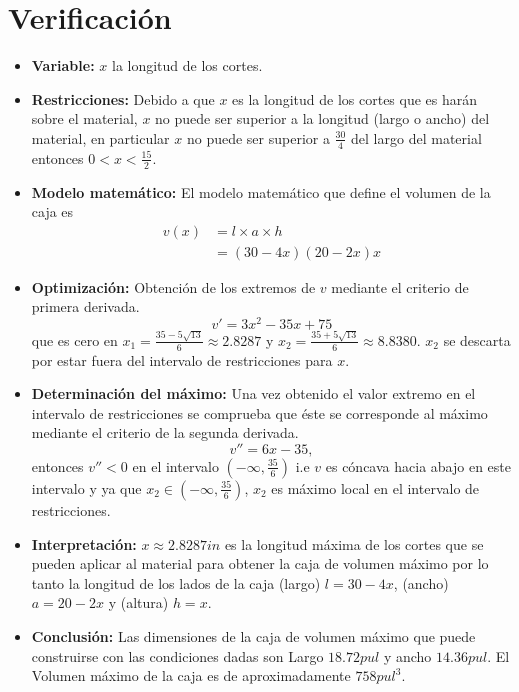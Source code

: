 \documentclass[a0paper,fleqn]{betterposter}
\begin{document}
{}{

\section{Verificación}
\begin{itemize}
    \item \textbf{Variable:} $x$ la longitud de los cortes.
    \item \textbf{Restricciones:} Debido a que $x$ es la longitud de los cortes que es harán sobre el material, $x$ no puede ser superior a la longitud (largo o ancho) del material, en particular $x$ no puede ser superior a $\frac{30}{4}$ del largo del material entonces $0 < x < \frac{15}{2}$.
    \item \textbf{Modelo matemático:} El modelo matemático que define el volumen de la caja es 
        \begin{align*}
            v(x) &= l\times a \times h \\
            &= (30 - 4x)(20 - 2x)x \tag{1} \label{eq:model}
        \end{align*}
    \item \textbf{Optimización:} Obtención de los extremos de $v$ mediante el criterio de primera derivada.
        \[
            v' = 3x^2 - 35x + 75 \tag{2} \label{eq:first_derivative}
        \]
        que es cero en $x_1 = \frac{35 - 5\sqrt{13}}{6} \approx 2.8287$ y $x_2 = \frac{35 + 5\sqrt{13}}{6} \approx 8.8380$. $x_2$ se descarta por estar fuera del intervalo de restricciones para $x$.
    \item \textbf{Determinación del máximo:} Una vez obtenido el valor extremo en el intervalo de restricciones se comprueba que éste se corresponde al máximo mediante el criterio de la segunda derivada.
        \[
            v'' = 6x - 35, \tag{3} \label{eq:second_derivative}
        \]
        entonces $v'' < 0$ en el intervalo $\left(-\infty, \frac{35}{6}\right)$ i.e $v$ es cóncava hacia abajo en este intervalo y ya que $x_2 \in \left(-\infty, \frac{35}{6}\right)$, $x_2$ es máximo local en el intervalo de restricciones.
    \item \textbf{Interpretación:} $x \approx 2.8287 in$ es la longitud máxima de los cortes que se pueden aplicar al material para obtener la caja de volumen máximo por lo tanto la longitud de los lados de la caja (largo) $l = 30 - 4x$, (ancho) $a = 20 - 2x$ y (altura) $h = x$.
    \item \textbf{Conclusión:} Las dimensiones de la caja de volumen máximo que puede construirse con las condiciones dadas son Largo $18.72 pul$ y ancho $14.36 pul$. El Volumen máximo de la caja es de aproximadamente $758 pul^3$.
\end{itemize}
}
\end{document}

